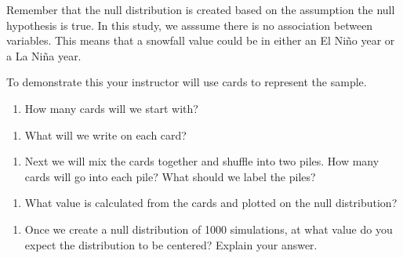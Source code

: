 \documentclass[
]{report}
\providecommand{\tightlist}{%
  \setlength{\itemsep}{0pt}\setlength{\parskip}{0pt}}
\begin{document}
Remember that the null distribution is created based on the assumption the null hypothesis is true. In this study, we asssume there is no association between variables. This means that a snowfall value could be in either an El Ni\~{n}o year or a La Ni\~{n}a year.

To demonstrate this your instructor will use cards to represent the sample.

\begin{enumerate}
\def\labelenumi{\arabic{enumi}.}
\setcounter{enumi}{9}
\tightlist
\item
  How many cards will we start with?
\end{enumerate}

\vspace{0.5in}

\begin{enumerate}
\def\labelenumi{\arabic{enumi}.}
\setcounter{enumi}{10}
\tightlist
\item
  What will we write on each card?
\end{enumerate}

\vspace{0.5in}

\begin{enumerate}
\def\labelenumi{\arabic{enumi}.}
\setcounter{enumi}{11}
\tightlist
\item
  Next we will mix the cards together and shuffle into two piles. How many cards will go into each pile? What should we label the piles?
\end{enumerate}

\vspace{1in}

\begin{enumerate}
\def\labelenumi{\arabic{enumi}.}
\setcounter{enumi}{12}
\tightlist
\item
  What value is calculated from the cards and plotted on the null distribution?
\end{enumerate}

\vspace{1in}

\begin{enumerate}
\def\labelenumi{\arabic{enumi}.}
\setcounter{enumi}{13}
\tightlist
\item
  Once we create a null distribution of 1000 simulations, at what value do you expect the distribution to be centered? Explain your answer.
\end{enumerate}

\vspace{1in}
\end{document}

